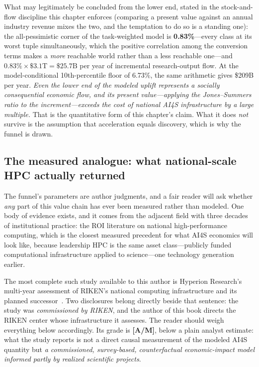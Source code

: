 What may legitimately be concluded from the lower end, stated in the stock-and-flow discipline this chapter enforces (comparing a present value against an annual industry revenue mixes the two, and the temptation to do so is a standing one): the all-pessimistic corner of the task-weighted model is \textbf{0.83\%}---every class at its worst tuple simultaneously, which the positive correlation among the conversion terms makes a \emph{more} reachable world rather than a less reachable one---and $0.83\% \times \$3.1\mathrm{T} = \$25.7\mathrm{B}$ per year of incremental research-output flow. At the model-conditional 10th-percentile floor of 6.73\%, the same arithmetic gives \$209B per year. \emph{Even the lower end of the modeled uplift represents a socially consequential economic flow, and its present value---applying the Jones--Summers ratio to the increment---exceeds the cost of national AI4S infrastructure by a large multiple.} That is the quantitative form of this chapter's claim. What it does \emph{not} survive is the assumption that acceleration equals discovery, which is why the funnel is drawn.

\subsection{The measured analogue: what national-scale HPC actually returned}
\label{sec:hyperion}

The funnel's parameters are author judgments, and a fair reader will ask whether \emph{any} part of this value chain has ever been measured rather than modeled. One body of evidence exists, and it comes from the adjacent field with three decades of institutional practice: the ROI literature on national high-performance computing, which is the closest measured precedent for what AI4S economics will look like, because leadership HPC is the same asset class---publicly funded computational infrastructure applied to science---one technology generation earlier.

The most complete such study available to this author is Hyperion Research's multi-year assessment of RIKEN's national computing infrastructure and its planned successor~\cite{hyperion-roi}. Two disclosures belong directly beside that sentence: the study was \emph{commissioned by RIKEN}, and the author of this book directs the RIKEN center whose infrastructure it assesses. The reader should weigh everything below accordingly. Its grade is \textbf{[A/M]}, below a plain analyst estimate: what the study reports is not a direct causal measurement of the modeled AI4S quantity but \emph{a commissioned, survey-based, counterfactual economic-impact model informed partly by realized scientific projects}.

